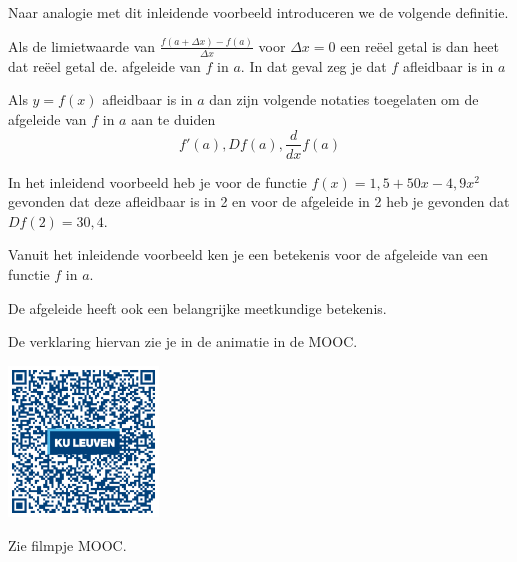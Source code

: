 Naar analogie met dit inleidende voorbeeld introduceren we de volgende definitie.

\begin{definitie}
	Als de limietwaarde van $\frac{f(a+\Delta x)-f(a)}{\Delta x}$ voor $\Delta x = 0$ een re\"eel getal is dan heet dat re\"eel getal de. afgeleide van $f$ in $a$.
	In dat geval zeg je dat $f$ afleidbaar is in $a$
\end{definitie}


\begin{notatie}
	Als $y=f(x)$ afleidbaar is in $a$ dan zijn volgende notaties toegelaten om de afgeleide van $f$ in $a$ aan te duiden
	\[f'(a), Df(a), \frac{d}{dx}f(a)\]
\end{notatie}


\begin{voorbeeld}
	In het inleidend voorbeeld heb je voor de functie  $f(x)=1,5+50 x -4,9 x^2$ gevonden dat deze afleidbaar is in 2 en voor de afgeleide in 2 heb je gevonden dat $Df(2)=30,4$.
\end{voorbeeld}\vspace{0,5 cm}

Vanuit het inleidende voorbeeld ken je een betekenis voor de afgeleide van een functie $f$ in $a$.\vspace{0,2 cm}

\vspace{0,5 cm}

De afgeleide heeft ook een belangrijke meetkundige betekenis.\vspace{0,2 cm}

\vspace{0,2 cm}

De verklaring hiervan zie je in de animatie in de MOOC.

\begin{minipage}{.25\linewidth}
	\raggedright
	\includegraphics[width=4cm]{6_afgeleiden_integralen/inputs/QR_Code_AFGANIMATIE_module6_1new}
\end{minipage}
\begin{minipage}{.7\linewidth}
	Zie filmpje MOOC.
\end{minipage}


